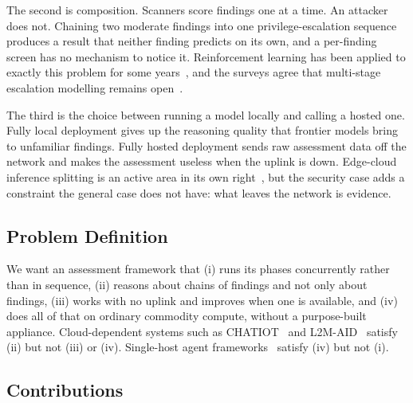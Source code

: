 \documentclass[journal]{IEEEtran}
\begin{document}
The second is composition. Scanners score findings one at a time. An attacker
does not. Chaining two moderate findings into one privilege-escalation
sequence produces a result that neither finding predicts on its own, and a
per-finding screen has no mechanism to notice it. Reinforcement learning has
been applied to exactly this problem for some years~\cite{yousefi2018,
sun2025poweriot, nguyen2025pengym}, and the surveys agree that multi-stage
escalation modelling remains open~\cite{zhou2025autonomous}.

The third is the choice between running a model locally and calling a hosted
one. Fully local deployment gives up the reasoning quality that frontier
models bring to unfamiliar findings. Fully hosted deployment sends raw
assessment data off the network and makes the assessment useless when the
uplink is down. Edge-cloud inference splitting is an active area in its own
right~\cite{hao2024}, but the security case adds a constraint the general case
does not have: what leaves the network is evidence.

\subsection{Problem Definition}

We want an assessment framework that (i) runs its phases concurrently rather
than in sequence, (ii) reasons about chains of findings and not only about
findings, (iii) works with no uplink and improves when one is available, and
(iv) does all of that on ordinary commodity compute, without a purpose-built
appliance. Cloud-dependent systems such as CHATIOT~\cite{dong2025} and
L2M-AID~\cite{xu2025} satisfy (ii) but not (iii) or (iv). Single-host agent
frameworks~\cite{bianou2024, shen2024, deng2024checkmate} satisfy (iv) but
not (i).

\subsection{Contributions}
\end{document}

